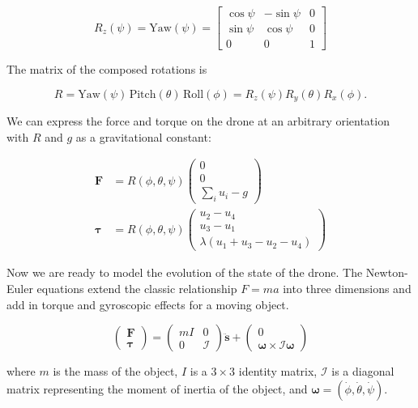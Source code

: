\documentclass{article}
\begin{document}
\[
R_z(\psi) = \text{Yaw}(\psi) =
\begin{bmatrix}
\cos\psi & -\sin\psi & 0 \\
\sin\psi & \cos\psi & 0 \\
0 & 0 & 1
\end{bmatrix}
\]

The matrix of the composed rotations is

\[
R = \text{Yaw}(\psi)\, \text{Pitch}(\theta)\, \text{Roll}(\phi) 
= R_z(\psi) R_y(\theta) R_x(\phi).
\]

We can express the force and torque on the drone at an arbitrary orientation with $R$ and $g$ as a gravitational constant:

\[
\begin{aligned}
    \mathbf{F} &= R(\phi, \theta, \psi) \begin{pmatrix} 
        0 \\ 
        0 \\ 
        \sum_{i} u_i - g
    \end{pmatrix} \\
    \bm{\tau} &= R(\phi, \theta, \psi) \begin{pmatrix}
        u_2 - u_4 \\ 
        u_3 - u_1 \\ 
        \lambda(u_1 + u_3 - u_2 - u_4) 
    \end{pmatrix}
\end{aligned}
\]

Now we are ready to model the evolution of the state of the drone. The Newton-Euler equations extend the classic relationship $F = m a$ into three dimensions and add in torque and gyroscopic effects for a moving object.

\begin{equation*}
\begin{pmatrix}
    \bm{F} \\
    \bm{\tau}
    \end{pmatrix}
    =
    \begin{pmatrix}
    m I & 0 \\
    0 & \mathcal{I}
    \end{pmatrix}
    \ddot{\bm{s}}
    +
    \begin{pmatrix}
    0 \\
    \bm{\omega} \times \mathcal{I} \bm{\omega}
\end{pmatrix}
\end{equation*}

where $m$ is the mass of the object, $I$ is a $3 \times 3$ identity matrix, $\mathcal{I}$ is a diagonal matrix representing the moment of inertia of the object, and $\bm{\omega} = (\dot{\phi}, \dot{\theta}, \dot{\psi})$.
\end{document}
